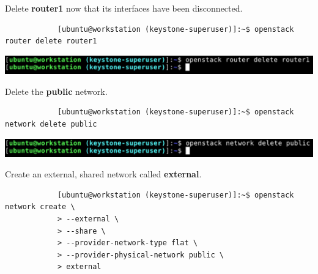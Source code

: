 \documentclass[letterpaper, 12pt]{article}
\begin{document}
\begin{enumerate}
    \begin{labstep}
        Delete \textbf{router1} now that its interfaces have been disconnected.
        \begin{lstlisting}
            [ubuntu@workstation (keystone-superuser)]:~$ openstack router delete router1
        \end{lstlisting}

        \begin{center}
            \includegraphics[width=\linewidth]{images/part1/step21.png}
        \end{center}
    \end{labstep}

    \begin{labstep}
        Delete the \textbf{public} network.
        \begin{lstlisting}
            [ubuntu@workstation (keystone-superuser)]:~$ openstack network delete public
        \end{lstlisting}

        \begin{center}
            \includegraphics[width=\linewidth]{images/part1/step22.png}
        \end{center}
    \end{labstep}

    \begin{labstep}
        Create an external, shared network called \textbf{external}.
        \begin{lstlisting}
            [ubuntu@workstation (keystone-superuser)]:~$ openstack network create \
            > --external \
            > --share \
            > --provider-network-type flat \
            > --provider-physical-network public \
            > external
        \end{lstlisting}


\end{labstep}
\end{enumerate}
\end{document}
